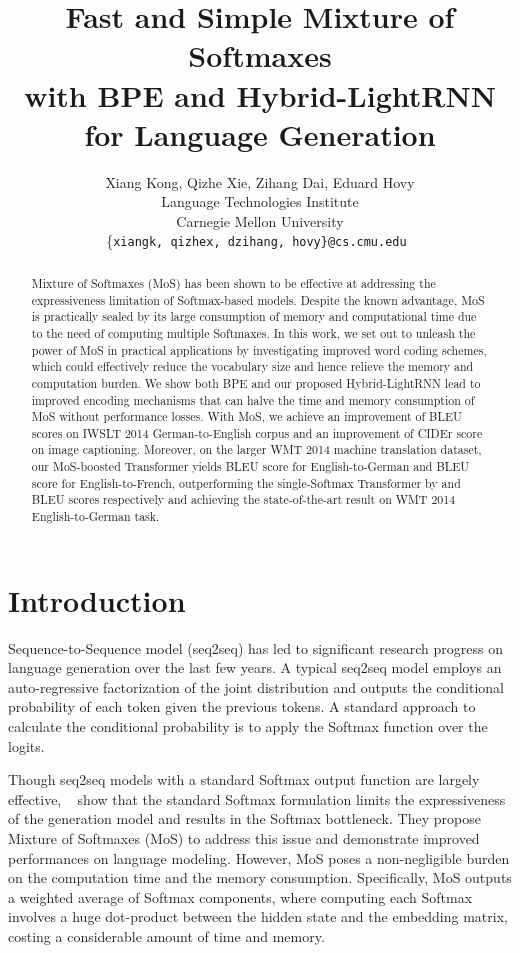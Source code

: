\documentclass[letterpaper]{article} \usepackage{aaai19}  \usepackage{times}  \usepackage{helvet}  \usepackage{courier}  \usepackage{url}  \usepackage{graphicx}  \frenchspacing  \usepackage{booktabs}
\begin{document}
\title{Fast and Simple Mixture of Softmaxes\\ with BPE and Hybrid-LightRNN for Language Generation}
\author{Xiang Kong, Qizhe Xie, Zihang Dai, Eduard Hovy\\
  Language Technologies Institute\\
  Carnegie Mellon University\\
  \{\tt xiangk, qizhex, dzihang, hovy\}@cs.cmu.edu
}
\maketitle
\begin{abstract}
Mixture of Softmaxes (MoS) has been shown to be effective at addressing the expressiveness limitation of Softmax-based models. 
Despite the known advantage, MoS is practically sealed by its large consumption of memory and computational time due to the need of computing multiple Softmaxes.
In this work, we set out to unleash the power of MoS in practical applications by investigating improved word coding schemes, which could effectively reduce the vocabulary size and hence relieve the memory and computation burden. 
We show both BPE and our proposed Hybrid-LightRNN lead to improved encoding mechanisms that can halve the time and memory consumption of MoS without performance losses. 
With MoS, we achieve an improvement of  BLEU scores on IWSLT 2014 German-to-English corpus and an improvement of  CIDEr score on image captioning. 
Moreover, on the larger WMT 2014 machine translation dataset, our MoS-boosted Transformer yields  BLEU score for English-to-German and  BLEU score for English-to-French, outperforming the single-Softmax Transformer by  and  BLEU scores respectively and achieving the state-of-the-art result on WMT 2014 English-to-German task.
\end{abstract}
\section{Introduction}
\label{sec:intro}
Sequence-to-Sequence model (seq2seq) \cite{sutskever2014sequence,bahdanau2014neural} has led to significant research progress on language generation over the last few years. A typical seq2seq model employs an auto-regressive factorization of the joint distribution and outputs the conditional probability of each token given the previous tokens. A standard approach to calculate the conditional probability is to apply the Softmax function over the logits. 

Though seq2seq models with a standard Softmax output function are largely effective, \citeauthor{yang2017breaking}~ show that the standard Softmax formulation limits the expressiveness of the generation model and results in the Softmax bottleneck.
They propose Mixture of Softmaxes (MoS) to address this issue and demonstrate improved performances on language modeling. 
However, MoS poses a non-negligible burden on the computation time and the memory consumption. Specifically, MoS outputs a weighted average of  Softmax components, where computing each Softmax involves a huge dot-product between the hidden state and the embedding matrix, costing a considerable amount of time and memory.
\end{document}
